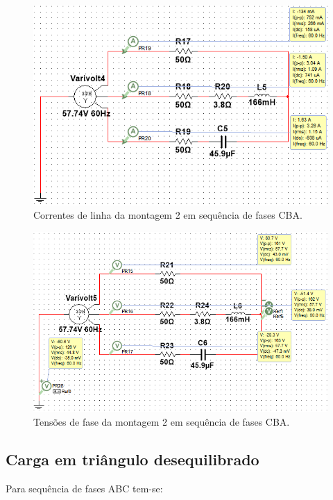 \documentclass[a4paper,12pt,oneside,openany,table,xcdraw]{article}
\begin{document}
\begin{figure}[H]
\centering
\includegraphics[width=13.5cm]{m2-esquema-cba-correntes}
\caption{Correntes de linha da montagem 2 em sequência de fases CBA.}
\label{m2:IL}
\end{figure}
\begin{figure}[H]
\centering
\includegraphics[width=13.5cm]{m2-esquema-cba-vf}
\caption{Tensões de fase da montagem 2 em sequência de fases CBA.}
\label{m1:VF}
\end{figure}

\newpage
\subsection{Carga em triângulo desequilibrado}
Para sequência de fases ABC tem-se: 
\end{document}

